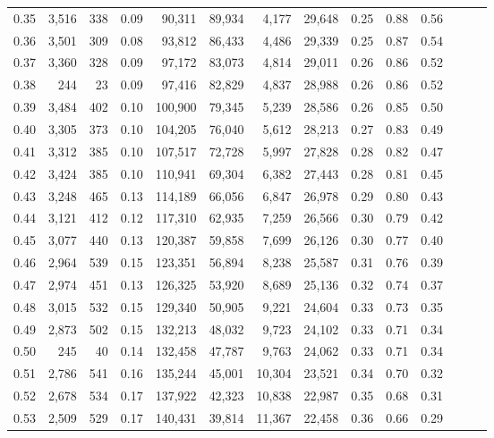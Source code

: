 \begin{tabular}{rrrrrrrrrrrrrr}
0.35 &  3,516 &  338 &  0.09 &   90,311 &   89,934 &   4,177 &  29,648 &  0.25 &  0.88 &      0.56 \\
0.36 &  3,501 &  309 &  0.08 &   93,812 &   86,433 &   4,486 &  29,339 &  0.25 &  0.87 &      0.54 \\
0.37 &  3,360 &  328 &  0.09 &   97,172 &   83,073 &   4,814 &  29,011 &  0.26 &  0.86 &      0.52 \\
0.38 &    244 &   23 &  0.09 &   97,416 &   82,829 &   4,837 &  28,988 &  0.26 &  0.86 &      0.52 \\
0.39 &  3,484 &  402 &  0.10 &  100,900 &   79,345 &   5,239 &  28,586 &  0.26 &  0.85 &      0.50 \\
0.40 &  3,305 &  373 &  0.10 &  104,205 &   76,040 &   5,612 &  28,213 &  0.27 &  0.83 &      0.49 \\
0.41 &  3,312 &  385 &  0.10 &  107,517 &   72,728 &   5,997 &  27,828 &  0.28 &  0.82 &      0.47 \\
0.42 &  3,424 &  385 &  0.10 &  110,941 &   69,304 &   6,382 &  27,443 &  0.28 &  0.81 &      0.45 \\
0.43 &  3,248 &  465 &  0.13 &  114,189 &   66,056 &   6,847 &  26,978 &  0.29 &  0.80 &      0.43 \\
0.44 &  3,121 &  412 &  0.12 &  117,310 &   62,935 &   7,259 &  26,566 &  0.30 &  0.79 &      0.42 \\
0.45 &  3,077 &  440 &  0.13 &  120,387 &   59,858 &   7,699 &  26,126 &  0.30 &  0.77 &      0.40 \\
0.46 &  2,964 &  539 &  0.15 &  123,351 &   56,894 &   8,238 &  25,587 &  0.31 &  0.76 &      0.39 \\
0.47 &  2,974 &  451 &  0.13 &  126,325 &   53,920 &   8,689 &  25,136 &  0.32 &  0.74 &      0.37 \\
0.48 &  3,015 &  532 &  0.15 &  129,340 &   50,905 &   9,221 &  24,604 &  0.33 &  0.73 &      0.35 \\
0.49 &  2,873 &  502 &  0.15 &  132,213 &   48,032 &   9,723 &  24,102 &  0.33 &  0.71 &      0.34 \\
0.50 &    245 &   40 &  0.14 &  132,458 &   47,787 &   9,763 &  24,062 &  0.33 &  0.71 &      0.34 \\
0.51 &  2,786 &  541 &  0.16 &  135,244 &   45,001 &  10,304 &  23,521 &  0.34 &  0.70 &      0.32 \\
0.52 &  2,678 &  534 &  0.17 &  137,922 &   42,323 &  10,838 &  22,987 &  0.35 &  0.68 &      0.31 \\
0.53 &  2,509 &  529 &  0.17 &  140,431 &   39,814 &  11,367 &  22,458 &  0.36 &  0.66 &      0.29 \\

\end{tabular}
